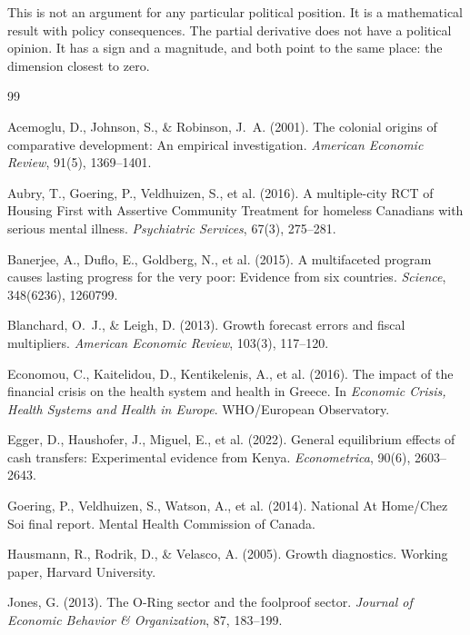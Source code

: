 \documentclass[12pt]{article}
\begin{document}
This is not an argument for any particular political position. It is a mathematical result with policy consequences. The partial derivative does not have a political opinion. It has a sign and a magnitude, and both point to the same place: the dimension closest to zero.


\begin{thebibliography}{99}

Acemoglu, D., Johnson, S., \& Robinson, J.~A. (2001).
The colonial origins of comparative development: An empirical investigation.
\emph{American Economic Review}, 91(5), 1369--1401.

Aubry, T., Goering, P., Veldhuizen, S., et al. (2016).
A multiple-city RCT of Housing First with Assertive Community Treatment for homeless Canadians with serious mental illness.
\emph{Psychiatric Services}, 67(3), 275--281.

Banerjee, A., Duflo, E., Goldberg, N., et al. (2015).
A multifaceted program causes lasting progress for the very poor: Evidence from six countries.
\emph{Science}, 348(6236), 1260799.

Blanchard, O.~J., \& Leigh, D. (2013).
Growth forecast errors and fiscal multipliers.
\emph{American Economic Review}, 103(3), 117--120.

Economou, C., Kaitelidou, D., Kentikelenis, A., et al. (2016).
The impact of the financial crisis on the health system and health in Greece.
In \emph{Economic Crisis, Health Systems and Health in Europe}. WHO/European Observatory.

Egger, D., Haushofer, J., Miguel, E., et al. (2022).
General equilibrium effects of cash transfers: Experimental evidence from Kenya.
\emph{Econometrica}, 90(6), 2603--2643.

Goering, P., Veldhuizen, S., Watson, A., et al. (2014).
National At Home/Chez Soi final report.
Mental Health Commission of Canada.

Hausmann, R., Rodrik, D., \& Velasco, A. (2005).
Growth diagnostics.
Working paper, Harvard University.

Jones, G. (2013).
The O-Ring sector and the foolproof sector.
\emph{Journal of Economic Behavior \& Organization}, 87, 183--199.


\end{thebibliography}
\end{document}
